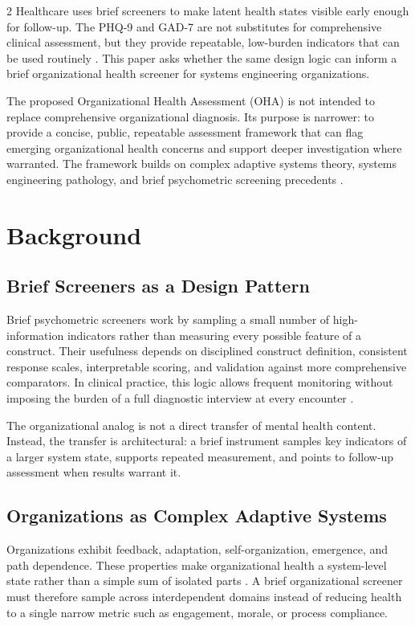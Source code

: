 \documentclass[11pt,letterpaper]{article}
\begin{document}
\begin{multicols*}{2}
Healthcare uses brief screeners to make latent health states visible early enough for follow-up. The PHQ-9 and GAD-7 are not substitutes for comprehensive clinical assessment, but they provide repeatable, low-burden indicators that can be used routinely \parencite{kroenke2001,spitzer2006}. This paper asks whether the same design logic can inform a brief organizational health screener for systems engineering organizations.

The proposed Organizational Health Assessment (OHA) is not intended to replace comprehensive organizational diagnosis. Its purpose is narrower: to provide a concise, public, repeatable assessment framework that can flag emerging organizational health concerns and support deeper investigation where warranted. The framework builds on complex adaptive systems theory, systems engineering pathology, and brief psychometric screening precedents \parencite{holland1995,anderson1999,davidz2018,carr2025}.

\section{Background}
\subsection{Brief Screeners as a Design Pattern}
Brief psychometric screeners work by sampling a small number of high-information indicators rather than measuring every possible feature of a construct. Their usefulness depends on disciplined construct definition, consistent response scales, interpretable scoring, and validation against more comprehensive comparators. In clinical practice, this logic allows frequent monitoring without imposing the burden of a full diagnostic interview at every encounter \parencite{kroenke2001,spitzer2006}.

The organizational analog is not a direct transfer of mental health content. Instead, the transfer is architectural: a brief instrument samples key indicators of a larger system state, supports repeated measurement, and points to follow-up assessment when results warrant it.

\subsection{Organizations as Complex Adaptive Systems}
Organizations exhibit feedback, adaptation, self-organization, emergence, and path dependence. These properties make organizational health a system-level state rather than a simple sum of isolated parts \parencite{holland1995,anderson1999}. A brief organizational screener must therefore sample across interdependent domains instead of reducing health to a single narrow metric such as engagement, morale, or process compliance.


\end{multicols*}
\end{document}
